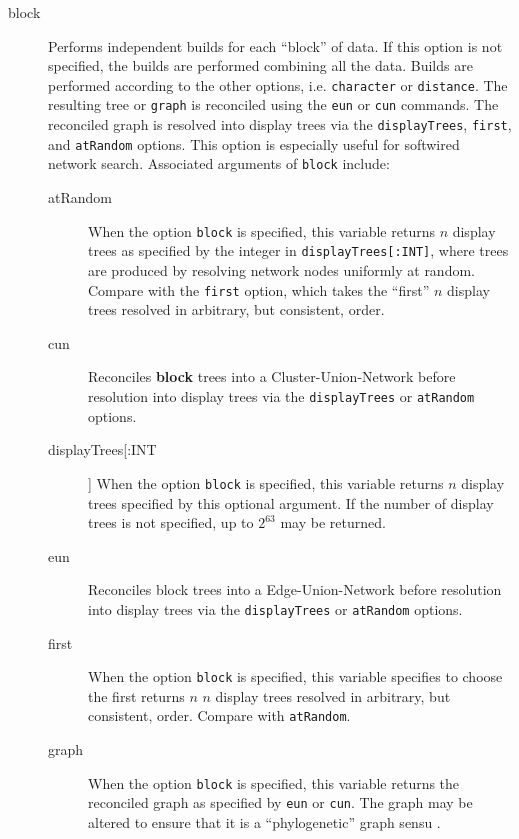 	\begin{description}
		\item[block] Performs independent builds for each ``block'' of data. If this option 
		is not specified, the builds are performed combining all the data. Builds are performed 
		according 	to the other options, i.e. \texttt{character} or \texttt{distance}. The resulting tree 
		or \texttt{graph} is reconciled using the \texttt{eun} or \texttt{cun} commands. The 
		reconciled graph is resolved into display trees via the \texttt{displayTrees}, \texttt{first}, 
		and \texttt{atRandom} options. This option is especially useful for softwired network search. 
		Associated arguments of \texttt{block} include:
				
		\begin{description}
			\item[atRandom] When the option \texttt{block} is specified, this variable returns $n$ 
			display trees as specified by the integer in \texttt{displayTrees[:INT]}, where 
			trees are produced by resolving network nodes uniformly at random. Compare with 
			the \texttt{first} option, which takes the ``first'' $n$ display trees resolved in arbitrary, 
			but consistent, order.
			
			\item[cun] Reconciles \textbf {block} trees into a Cluster-Union-Network \citep{Baroni2005} 
			before resolution into display trees via the \texttt{displayTrees} or \texttt{atRandom} 
			options.
	
			\item[displayTrees[:INT]] When the option \texttt{block} is specified, this variable 
			returns $n$ display trees specified by this optional argument. If the number of 
			display trees is not specified, up to $2^{63}$ may be returned.

			\item[eun] Reconciles block trees into a Edge-Union-Network \citep{MiyagiandWheeler2019, 
			Wheeler2022} before resolution into display trees via the \texttt{displayTrees} or 
			\texttt{atRandom} 
			options.

			\item[first] When the option \texttt{block} is specified, this variable specifies to 
			choose the first returns $n$ $n$ display trees resolved in arbitrary, but consistent, 
			order. Compare with 	\texttt{atRandom}.
			
			\item[graph] When the option \texttt{block} is specified, this variable returns the 
			reconciled graph as specified by \texttt{eun} or \texttt{cun}. The graph may be 
			altered to ensure that it is a ``phylogenetic'' graph sensu \cite{Moretetal2005}.
		\end{description}			
		

\end{description}
